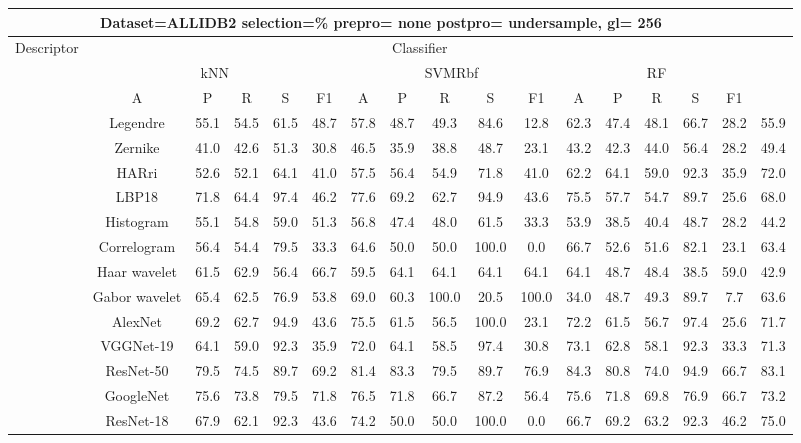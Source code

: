 \documentclass[12pt,italian]{article}
\begin{document}
\begin{tiny}
\begin{longtable}{lcccccccccccccccc}
\toprule
\multicolumn{16}{c}{Dataset=ALLIDB2 selection=\% prepro= none postpro= undersample, gl= 256} \\ 
\toprule
Descriptor & \multicolumn{15}{c}{Classifier} \\ 
& \multicolumn{5}{c}{kNN} & \multicolumn{5}{c}{SVMRbf} & \multicolumn{5}{c}{RF} \\ 
& A & P & R & S & F1 & A & P & R & S & F1 & A & P & R & S & F1 \\ 
\midrule
& Legendre & 55.1 & 54.5 & 61.5 & 48.7 & 57.8 & 48.7 & 49.3 & 84.6 & 12.8 & 62.3 & 47.4 & 48.1 & 66.7 & 28.2 & 55.9 \\ 
& Zernike & 41.0 & 42.6 & 51.3 & 30.8 & 46.5 & 35.9 & 38.8 & 48.7 & 23.1 & 43.2 & 42.3 & 44.0 & 56.4 & 28.2 & 49.4 \\ 
& HARri & 52.6 & 52.1 & 64.1 & 41.0 & 57.5 & 56.4 & 54.9 & 71.8 & 41.0 & 62.2 & 64.1 & 59.0 & 92.3 & 35.9 & 72.0 \\ 
& LBP18 & 71.8 & 64.4 & 97.4 & 46.2 & 77.6 & 69.2 & 62.7 & 94.9 & 43.6 & 75.5 & 57.7 & 54.7 & 89.7 & 25.6 & 68.0 \\ 
& Histogram & 55.1 & 54.8 & 59.0 & 51.3 & 56.8 & 47.4 & 48.0 & 61.5 & 33.3 & 53.9 & 38.5 & 40.4 & 48.7 & 28.2 & 44.2 \\ 
& Correlogram & 56.4 & 54.4 & 79.5 & 33.3 & 64.6 & 50.0 & 50.0 & 100.0 &  0.0 & 66.7 & 52.6 & 51.6 & 82.1 & 23.1 & 63.4 \\ 
& Haar wavelet & 61.5 & 62.9 & 56.4 & 66.7 & 59.5 & 64.1 & 64.1 & 64.1 & 64.1 & 64.1 & 48.7 & 48.4 & 38.5 & 59.0 & 42.9 \\ 
& Gabor wavelet & 65.4 & 62.5 & 76.9 & 53.8 & 69.0 & 60.3 & 100.0 & 20.5 & 100.0 & 34.0 & 48.7 & 49.3 & 89.7 &  7.7 & 63.6 \\ 
& AlexNet & 69.2 & 62.7 & 94.9 & 43.6 & 75.5 & 61.5 & 56.5 & 100.0 & 23.1 & 72.2 & 61.5 & 56.7 & 97.4 & 25.6 & 71.7 \\ 
& VGGNet-19 & 64.1 & 59.0 & 92.3 & 35.9 & 72.0 & 64.1 & 58.5 & 97.4 & 30.8 & 73.1 & 62.8 & 58.1 & 92.3 & 33.3 & 71.3 \\ 
& ResNet-50 & 79.5 & 74.5 & 89.7 & 69.2 & 81.4 & 83.3 & 79.5 & 89.7 & 76.9 & 84.3 & 80.8 & 74.0 & 94.9 & 66.7 & 83.1 \\ 
& GoogleNet & 75.6 & 73.8 & 79.5 & 71.8 & 76.5 & 71.8 & 66.7 & 87.2 & 56.4 & 75.6 & 71.8 & 69.8 & 76.9 & 66.7 & 73.2 \\ 
& ResNet-18 & 67.9 & 62.1 & 92.3 & 43.6 & 74.2 & 50.0 & 50.0 & 100.0 &  0.0 & 66.7 & 69.2 & 63.2 & 92.3 & 46.2 & 75.0 \\ 

\end{longtable}
\end{tiny}
\end{document}
